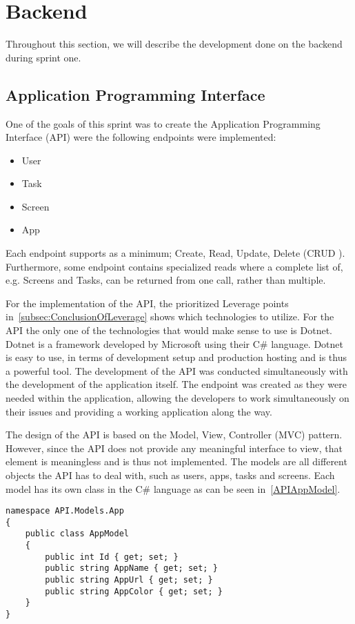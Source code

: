 \section{Backend}\label{sec:sprint-one-backend}
Throughout this section, we will describe the development done on the backend during sprint one.

\subsection{Application Programming Interface}
One of the goals of this sprint was to create the Application Programming Interface (API) were the following endpoints were implemented:

\begin{itemize}
    \item User
    \item Task
    \item Screen
    \item App
\end{itemize}

Each endpoint supports as a minimum; Create, Read, Update, Delete (CRUD \cite{CRUD}).
Furthermore, some endpoint contains specialized reads where a complete list of, e.g. Screens and Tasks, can be returned from one call, rather than multiple. 

For the implementation of the API, the prioritized Leverage points in~\autoref{subsec:ConclusionOfLeverage} shows which technologies to utilize.
For the API the only one of the technologies that would make sense to use is Dotnet.
Dotnet is a framework developed by Microsoft using their C\# language.
Dotnet is easy to use, in terms of development setup and production hosting and is thus a powerful tool.\cite{DotnetWebsite}
The development of the API was conducted simultaneously with the development of the application itself.
The endpoint was created as they were needed within the application, allowing the developers to work simultaneously on their issues and providing a working application along the way.

The design of the API is based on the Model, View, Controller (MVC) pattern\cite{MVC}.
However, since the API does not provide any meaningful interface to view, that element is meaningless and is thus not implemented.
The models are all different objects the API has to deal with, such as users, apps, tasks and screens.
Each model has its own class in the C\# language as can be seen in~\autoref{APIAppModel}.

\begin{lstlisting}[caption={API App model}, label={APIAppModel}, language={CSharp}]
namespace API.Models.App
{
    public class AppModel
    {
        public int Id { get; set; }
        public string AppName { get; set; }
        public string AppUrl { get; set; }
        public string AppColor { get; set; }
    }
}
\end{lstlisting}

